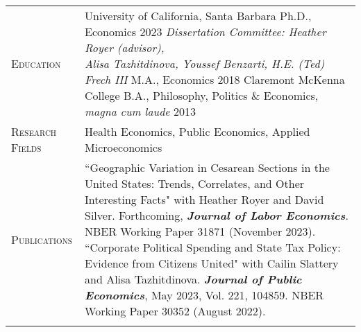 \documentclass[11pt]{article}
\newcommand{\xspace}{23pt}
\begin{document}
\begin{tabularx}{\textwidth}{@{}Y Z@{}}
	\textsc{Education} &
	University of California, Santa Barbara
	\vspace{3pt} \newline
	\hspace*{20pt} Ph.D., Economics \hfill 2023%
	\vspace{3pt} \newline
	\hspace*{20pt} \textit{Dissertation Committee: Heather Royer (advisor), \newline \hspace*{20pt} Alisa Tazhitdinova, Youssef Benzarti, H.E. (Ted) Frech III} 
	\vspace{3pt} \newline
	\hspace*{20pt} M.A., Economics \hfill 2018%
	\vspace{10pt} \newline
	Claremont McKenna College
	\vspace{3pt} \newline
	\hspace*{20pt} B.A., Philosophy, Politics \& Economics, \textit{magna cum laude} \hfill 2013%
    \\  \addlinespace[\xspace] 

	\textsc{Research Fields} & 
	Health Economics, Public Economics, Applied Microeconomics
	\\ \addlinespace[\xspace] 

	\textsc{Publications} & 
	``Geographic Variation in Cesarean Sections in the United States: Trends, Correlates, \newline  and Other Interesting Facts" with Heather Royer and David Silver. Forthcoming, \newline \textbf{\textit{Journal of Labor Economics}}. NBER Working Paper 31871 (November 2023).
	\vspace{10pt} \newline
	``Corporate Political Spending and State Tax Policy: Evidence from Citizens United" \newline with Cailin Slattery and Alisa Tazhitdinova. \textbf{\textit{Journal of Public Economics}}, \newline May 2023, Vol. 221, 104859. NBER Working Paper 30352 (August 2022).
	\\ \addlinespace[\xspace] 
	

\end{tabularx}
\end{document}
